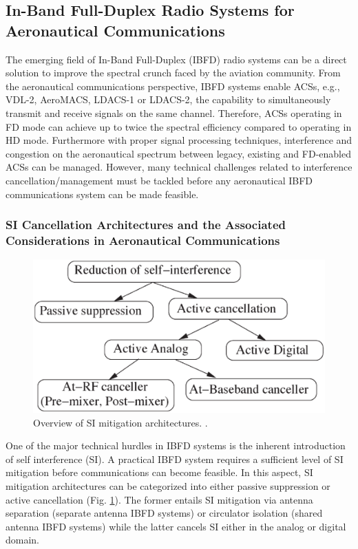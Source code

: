\subsection{In-Band Full-Duplex Radio Systems for Aeronautical Communications}

The emerging field of In-Band Full-Duplex (IBFD) radio systems can be a direct solution to improve the spectral crunch faced by the aviation community. From the aeronautical communications perspective, IBFD systems enable ACSs, e.g., VDL-2, AeroMACS, LDACS-1 or LDACS-2, the capability to simultaneously transmit and receive signals on the same channel. Therefore, ACSs operating in FD mode can achieve up to twice the spectral efficiency compared to operating in HD mode. Furthermore with proper signal processing techniques, interference and congestion on the aeronautical spectrum between legacy, existing and FD-enabled ACSs can be managed. However, many technical challenges related to interference cancellation/management must be tackled before any aeronautical IBFD communications system can be made feasible.

\subsubsection{SI Cancellation Architectures and the Associated Considerations in Aeronautical Communications}
\begin{figure} []
\centering
\vspace{-0.7in}
\includegraphics [width=0.7\columnwidth]{chap2_fig/IBFD_fig2.eps} 
\vspace{-0.8in}
\caption{Overview of SI mitigation architectures. \cite{sahai2013impact}.}
\label{fig:IBFD_2}
\end{figure}

One of the major technical hurdles in IBFD systems is the inherent introduction of self interference (SI). A practical IBFD system requires a sufficient level of SI mitigation before communications can become feasible. In this aspect, SI mitigation architectures can be categorized into either passive suppression or active cancellation \cite{sahai2013impact} (Fig. \ref{fig:IBFD_2}). The former entails SI mitigation via antenna separation (separate antenna IBFD systems) \cite{duarte2014design,ahmed2012simultaneous} or circulator isolation (shared antenna IBFD systems) \cite{bharadia2013full,huberman2015mimo} while the latter cancels SI either in the analog or digital domain. 


